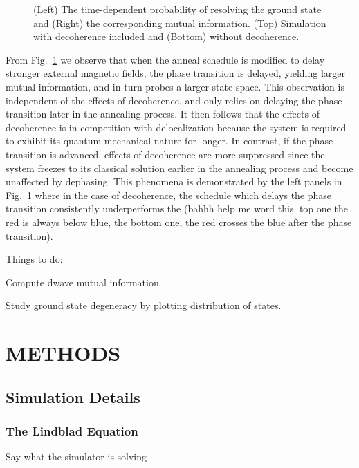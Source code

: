 \documentclass[prd,twocolumn,tightenlines,preprintnumbers,showpacs,superscriptaddress,notitlepage,nofootinbib,eqsecnum,floatfix,longbibliography]{revtex4}
\begin{document}
\begin{figure}
	\caption{(Left) The time-dependent probability of resolving the ground state and (Right) the corresponding mutual information. (Top) Simulation with decoherence included and (Bottom) without decoherence.}
	\label{fig:prob_mi}
\end{figure}

From Fig.~\ref{fig:prob_mi} we observe that when the anneal schedule is modified to delay stronger external magnetic fields, the phase transition is delayed, yielding larger mutual information, and in turn probes a larger state space. This observation is independent of the effects of decoherence, and only relies on delaying the phase transition later in the annealing process. It then follows that the effects of decoherence is in competition with delocalization because the system is required to exhibit its quantum mechanical nature for longer. In contrast, if the phase transition is advanced, effects of decoherence are more suppressed since the system freezes to its classical solution earlier in the annealing process and {\color{blue}become unaffected by dephasing.} This phenomena is demonstrated by the left panels in Fig.~\ref{fig:prob_mi} where in the case of decoherence, the schedule which delays the phase transition consistently underperforms the (bahhh help me word this. top one the red is always below blue, the bottom one, the red crosses the blue after the phase transition).

Things to do:

Compute dwave mutual information

Study ground state degeneracy by plotting distribution of states.

\section{METHODS}
\subsection{Simulation Details}
\subsubsection{The Lindblad Equation}
\label{sec:methods:lindblad}
Say what the simulator is solving
\end{document}
